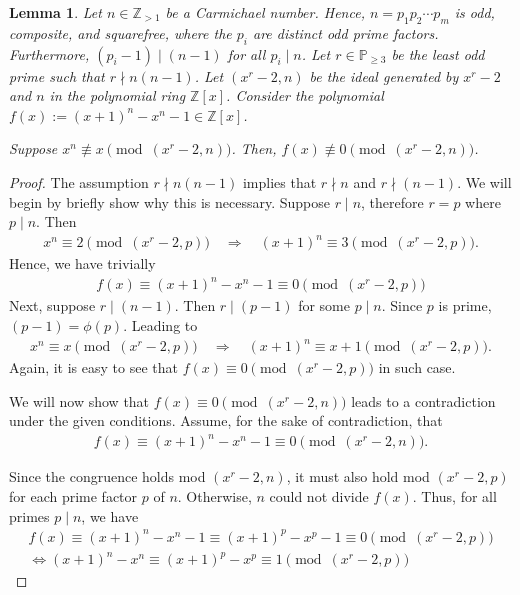 \documentclass{article}
\theoremstyle{plain}
\newtheorem{lemma}[theorem]{Lemma}
\theoremstyle{definition}
\newcommand{\Z}{\mathbb{Z}}
\begin{document}
\begin{lemma} \label{proof:carmichaelnumbersfail}
Let $n \in \Z_{>1}$ be a Carmichael number. Hence, $n = p_1 p_2 \cdots p_m$ is odd, composite, and squarefree, where the $p_i$ are distinct odd prime factors. Furthermore, $(p_i-1) \mid (n-1)$ for all $p_i \mid n$. Let $r \in \mathbb{P}_{\geq 3}$ be the least odd prime such that $r \nmid n (n-1)$. Let $(x^r-2, n)$ be the ideal generated by $x^r-2$ and $n$ in the polynomial ring $\Z[x]$. Consider the polynomial $f(x) := (x+1)^n - x^n - 1 \in \Z[x]$.

Suppose $x^n \not\equiv x \pmod{(x^r-2,n)}$. Then, $f(x) \not\equiv 0 \pmod{(x^r-2, n)}$.
\end{lemma}
\begin{proof}
The assumption $r \nmid n (n-1)$ implies that $r \nmid n$ and $r \nmid (n-1)$. We will begin by briefly show why this is necessary. Suppose $r \mid n$, therefore $r = p$ where $p \mid n$. Then
\begin{align*}
    x^n \equiv 2 \pmod{(x^r-2, p)}
    \quad \Longrightarrow \quad
    (x+1)^n \equiv 3 \pmod{(x^r-2, p)} .
\end{align*}
Hence, we have trivially
\begin{align*}
    f(x) \equiv (x+1)^n - x^n - 1 \equiv 0 \pmod{(x^r-2, p)}
\end{align*}
Next, suppose $r \mid (n-1)$. Then $r \mid (p-1)$ for some $p \mid n$. Since $p$ is prime, $(p-1) = \phi(p)$. Leading to
\begin{align*}
    x^n \equiv x \pmod{(x^r-2, p)}
    \quad \Longrightarrow \quad
    (x+1)^n \equiv x+1 \pmod{(x^r-2, p)} .
\end{align*}
Again, it is easy to see that $f(x) \equiv 0 \pmod{(x^r-2, p)}$ in such case.

We will now show that $f(x) \equiv 0 \pmod{(x^r-2, n)}$ leads to a contradiction under the given conditions. Assume, for the sake of contradiction, that
\begin{align*}
    f(x) \equiv (x+1)^n - x^n - 1 \equiv 0 \pmod{(x^r-2, n)} .
\end{align*}

Since the congruence holds mod $(x^r-2, n)$, it must also hold mod $(x^r-2, p)$ for each prime factor $p$ of $n$. Otherwise, $n$ could not divide $f(x)$. Thus, for all primes $p \mid n$, we have
\begin{align*}
f(x) \equiv (x+1)^n - x^n - 1 \equiv (x+1)^p - x^p - 1 \equiv 0 \pmod{(x^r-2, p)} \\
\Longleftrightarrow (x+1)^n - x^n \equiv (x+1)^p - x^p \equiv 1 \pmod{(x^r-2, p)}
\end{align*}


\end{proof}
\end{document}
